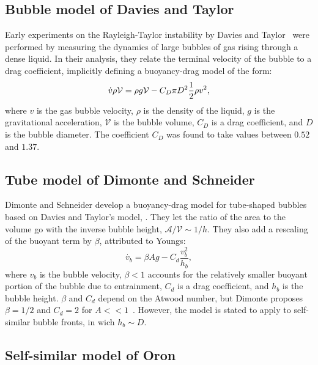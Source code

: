 \subsection{Bubble model of Davies and Taylor}

Early experiments on the Rayleigh-Taylor instability by Davies and Taylor~\cite{Davies1950a} were performed by measuring the dynamics of large bubbles of gas rising through a dense liquid.
In their analysis, they relate the terminal velocity of the bubble to a drag coefficient, implicitly defining a buoyancy-drag model of the form:
\begin{equation} \elabel{dtbd}
\dot{v} \rho \mathcal{V} = \rho g \mathcal{V} - C_D \pi D^2 \frac{1}{2} \rho v^2,
\end{equation}
where $v$ is the gas bubble velocity,
$\rho$ is the density of the liquid,
$g$ is the gravitational acceleration,
$\mathcal{V}$ is the bubble volume,
$C_D$ is a drag coefficient, and
$D$ is the bubble diameter.
The coefficient $C_D$ was found to take values between $0.52$ and $1.37$.

\subsection{Tube model of Dimonte and Schneider}

Dimonte and Schneider develop a buoyancy-drag model for tube-shaped bubbles~\cite{Dimonte1996,Dimonte2000a} based on Davies and Taylor's model, .
They let the ratio of the area to the volume go with the inverse bubble height, $\mathcal{A} / \mathcal{V} \sim 1/h$.
They also add a rescaling of the buoyant term by $\beta$, attributed to Youngs:
\begin{equation}
\dot{v_b}  = \beta A g - C_d \frac{v_b^2}{h_b}, 
\end{equation}
where $v_b$ is the bubble velocity,
$\beta < 1$ accounts for the relatively smaller buoyant portion of the bubble due to entrainment,
$C_d$ is a drag coefficient, and
$h_b$ is the bubble height.
$\beta$ and $C_d$ depend on the Atwood number, but Dimonte proposes $\beta = 1/2$ and $C_d = 2$ for $A << 1$~\cite{Dimonte2000}.
However, the model is stated to apply to self-similar bubble fronts, in wich $h_b \sim D$.

\subsection{Self-similar model of Oron}


